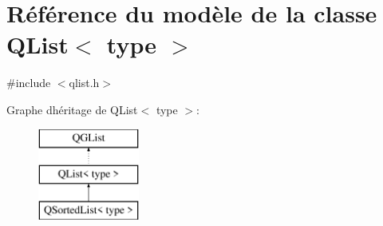 \hypertarget{class_q_list}{}\section{Référence du modèle de la classe Q\+List$<$ type $>$}
\label{class_q_list}


{\ttfamily \#include $<$qlist.\+h$>$}

Graphe d\textquotesingle{}héritage de Q\+List$<$ type $>$\+:\begin{figure}[H]
\begin{center}
\leavevmode
\includegraphics[height=3.000000cm]{class_q_list}
\end{center}
\end{figure}
